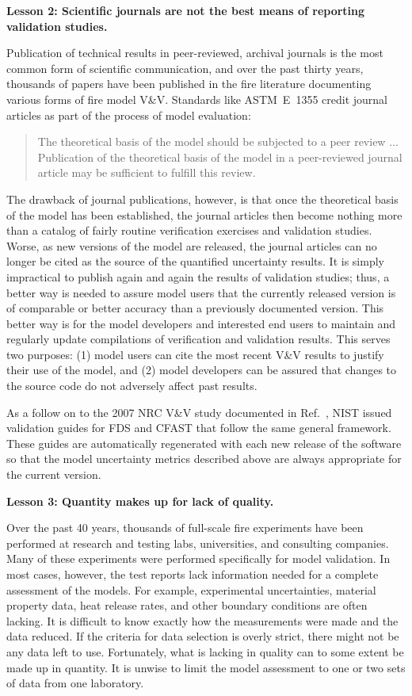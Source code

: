 \documentclass[fleqn,b5paper]{article}
\begin{document}
\vspace{\parskip}
{\bf Lesson 2: Scientific journals are not the best means of reporting validation studies.}

Publication of technical results in peer-reviewed, archival journals is the most common form of scientific communication, and over the past thirty years, thousands of papers have been published in the fire literature documenting various forms of fire model V\&V. Standards like ASTM~E~1355 credit journal articles as part of the process of model evaluation:
\begin{quote}
The theoretical basis of the model should be subjected to a peer review $\ldots$ Publication of the theoretical basis of the model in a peer-reviewed journal article may be sufficient to fulfill this review.
\end{quote}
The drawback of journal publications, however, is that once the theoretical basis of the model has been established, the journal articles then become nothing more than a catalog of fairly routine verification exercises and validation studies. Worse, as new versions of the model are released, the journal articles can no longer be cited as the source of the quantified uncertainty results. It is simply impractical to publish again and again the results of validation studies; thus, a better way is needed to assure model users that the currently released version is of comparable or better accuracy than a previously documented version. This better way is for the model developers and interested end users to maintain and regularly update compilations of verification and validation results. This serves two purposes: (1) model users can cite the most recent V\&V results to justify their use of the model, and (2) model developers can be assured that changes to the source code do not adversely affect past results.

As a follow on to the 2007 NRC V\&V study documented in Ref.~\cite{NUREG_1824}, NIST issued validation guides for FDS and CFAST that follow the same general framework. These guides are automatically regenerated with each new release of the software so that the model uncertainty metrics described above are always appropriate for the current version.


\vspace{\parskip}
{\bf Lesson 3: Quantity makes up for lack of quality.}

Over the past 40 years, thousands of full-scale fire experiments have been performed at research and testing labs, universities, and consulting companies. Many of these experiments were performed specifically for model validation. In most cases, however, the test reports lack information needed for a complete assessment of the models. For example, experimental uncertainties, material property data, heat release rates, and other boundary conditions are often lacking. It is difficult to know exactly how the measurements were made and the data reduced. If the criteria for data selection is overly strict, there might not be any data left to use. Fortunately, what is lacking in quality can to some extent be made up in quantity. It is unwise to limit the model assessment to one or two sets of data from one laboratory.
\end{document}
